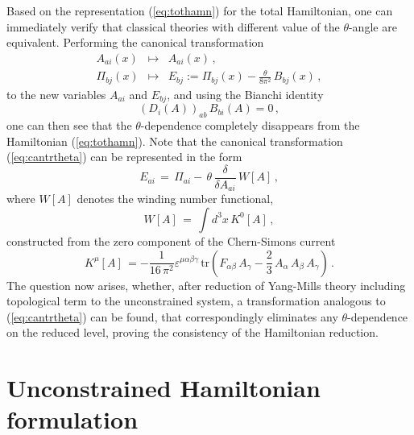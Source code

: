\documentclass[a4paper,12pt]{article}
\newcommand{\nn}{\nonumber}
\begin{document}
Based on the representation (\ref{eq:tothamn}) for the total Hamiltonian,
one can immediately verify that classical theories with different
value of the $\theta$-angle are equivalent.
Performing the canonical transformation
\begin{eqnarray}
A_{ai}(x)   &\longmapsto & A_{ai}(x) \,, \nn\\
\Pi_{bj}(x) &\longmapsto & E_{bj}    :=
\Pi_{bj}(x) - \frac{\theta}{8 \pi^2}\, B_{bj}(x)\,,
\label{eq:cantrtheta}
\end{eqnarray}
to the new variables $A_{ai}$ and $E_{bj}$,
and using the Bianchi identity
\begin{equation}
(D_i(A))_{ab} \, B_{bi}(A) = 0\,,
\end{equation}
one can then see that the $\theta$-dependence completely
disappears from the Hamiltonian (\ref{eq:tothamn}).
Note that the canonical transformation (\ref{eq:cantrtheta})
can be represented in the form
\begin{equation} \label{clctr}
E_{ai}\,  =
\, \Pi_{ai} - \, \theta \,\frac{\delta}{\delta A_{ai}}\, W[A]\,,
\end{equation}
where $W[A]$ denotes the winding number functional,
\begin{equation}\label{clctr1}
W[A] \, = \, \int d^3 x \, K^0[A]\,,
\end{equation}
constructed from the zero component of the Chern-Simons current
\begin{equation}
\label{CSC}
K^\mu[A] \, = - \frac{1}{16 \, \pi^2}\varepsilon^{\mu\alpha\beta\gamma}\,
\mbox{tr}
\left(
F_{\alpha\beta} \, A_\gamma - \frac{2}{3}\, A_\alpha \, A_\beta \, A_\gamma
\right)\,.
\end{equation}
The question now arises, whether, after reduction of Yang-Mills theory
including topological term to the unconstrained system,
a transformation analogous to (\ref{eq:cantrtheta}) can be found,
that correspondingly eliminates any $\theta$-dependence on the
reduced level, proving the consistency of the Hamiltonian reduction.


\section{Unconstrained Hamiltonian formulation}

\label{sec:unhf}
\end{document}
